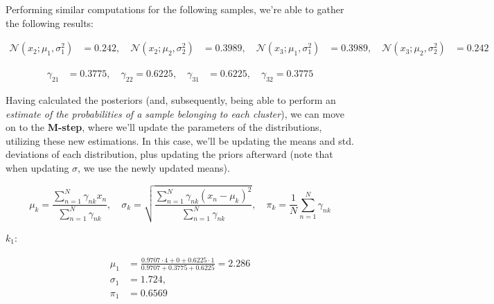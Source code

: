 \documentclass[12pt]{article}
\begin{document}
\begin{enumerate}[leftmargin=\labelsep]
  Performing similar computations for the following samples, we're able to gather
  the following results:

  \begin{equation*}
    \begin{aligned}
      \mathcal{N} (x_2; \mu_1, \sigma_1^2) & = 0.242, \quad
      \mathcal{N} (x_2; \mu_2, \sigma_2^2) & = 0.3989, \quad
      \mathcal{N} (x_3; \mu_1, \sigma_1^2) & = 0.3989, \quad
      \mathcal{N} (x_3; \mu_2, \sigma_2^2) & = 0.242
    \end{aligned}
  \end{equation*}

  \begin{equation*}
    \begin{aligned}
      \gamma_{21} & = 0.3775, \quad
      \gamma_{22} = 0.6225, \quad
      \gamma_{31} & = 0.6225, \quad
      \gamma_{32} = 0.3775
    \end{aligned}
  \end{equation*}

  Having calculated the posteriors (and, subsequently, being able to perform an \textit{estimate
    of the probabilities of a sample belonging to each cluster}), we can move on to the
  \textbf{M-step}, where we'll update the parameters of the distributions, utilizing these
  new estimations. In this case, we'll be updating the means and std. deviations of each
  distribution, plus updating the priors afterward (note that when updating $\sigma$,
  we use the newly updated means).

  \begin{equation*}
    \mu_k = \frac{\sum_{n = 1}^N \gamma_{nk} x_n}{\sum_{n = 1}^N \gamma_{nk}}, \quad
    \sigma_k = \sqrt{\frac{\sum_{n = 1}^N \gamma_{nk} (x_n - \mu_k)^2}{\sum_{n = 1}^N \gamma_{nk}}}, \quad
    \pi_k = \frac{1}{N} \sum_{n = 1}^N \gamma_{nk}
  \end{equation*}

  \begin{paracol}{2}
    \setlength{\columnseprule}{1pt}
    \def\columnseprulecolor{\color{black}}
    \centering

    $k_1$:

    \begin{equation*}
      \begin{aligned}
        \mu_1    & = \frac{0.9707 \cdot 4 + 0 + 0.6225 \cdot 1}{0.9707 + 0.3775 + 0.6225} = 2.286 \\
        \sigma_1 & = 1.724,                                                                       \\
        \pi_1    & = 0.6569
      \end{aligned}
    \end{equation*}


\end{paracol}
\end{enumerate}
\end{document}

